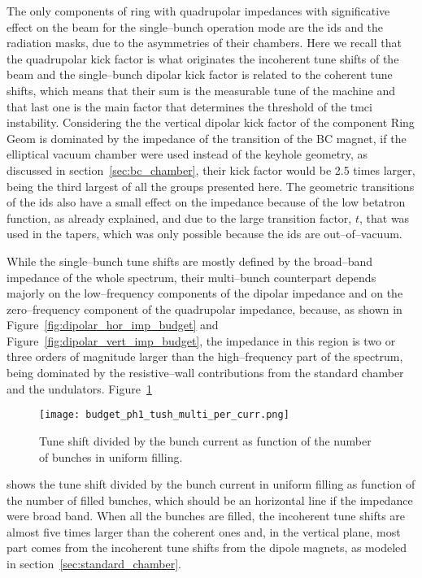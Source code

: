    The only components of ring with quadrupolar impedances with significative effect on the beam for the single--bunch operation mode are the \glspl{id} and the radiation masks, due to the asymmetries of their chambers. Here we recall that the quadrupolar kick factor is what originates the incoherent tune shifts of the beam and the single--bunch dipolar kick factor is related to the coherent tune  shifts, which means that their sum is the measurable tune of the machine and that last one is the main factor that determines the threshold of the \gls{tmci} instability. Considering the the vertical dipolar kick factor of the component Ring Geom is dominated by the impedance of the transition of the BC magnet, if the elliptical vacuum chamber were used instead of the keyhole geometry, as discussed in section~\ref{sec:bc_chamber}, their kick factor would be \num{2.5} times larger, being the third largest of all the groups presented here. The geometric transitions of the \glspl{id} also have a small effect on the impedance because of the low betatron function, as already explained, and due to the large transition factor, $t$, that was used in the tapers, which was only possible because the \glspl{id} are out--of--vacuum.

    While the single--bunch tune shifts are mostly defined by the broad--band impedance of the whole spectrum, their multi--bunch counterpart depends majorly on the low--frequency components of the dipolar impedance and on the zero--frequency component of the quadrupolar impedance, because, as shown in Figure~\ref{fig:dipolar_hor_imp_budget} and Figure~\ref{fig:dipolar_vert_imp_budget}, the impedance in this region is two or three orders of magnitude larger than the high--frequency part of the spectrum, being dominated by the resistive--wall contributions from the standard chamber and the undulators.
    Figure~\ref{fig:ph1_tush_multi_per_curr}
    \begin{figure}
        \centering
        \texttt{[image: budget\_ph1\_tush\_multi\_per\_curr.png]}
        \caption{Tune shift divided by the bunch current as function of the number of bunches in uniform filling.}
        \label{fig:ph1_tush_multi_per_curr}
    \end{figure}
    shows the tune shift divided by the bunch current in uniform filling as function of the number of filled bunches, which should be an horizontal line if the impedance were broad band. When all the bunches are filled, the incoherent tune shifts are almost five times larger than the coherent ones and, in the vertical plane, most part comes from the  incoherent tune shifts from the dipole magnets, as modeled in section~\ref{sec:standard_chamber}.


